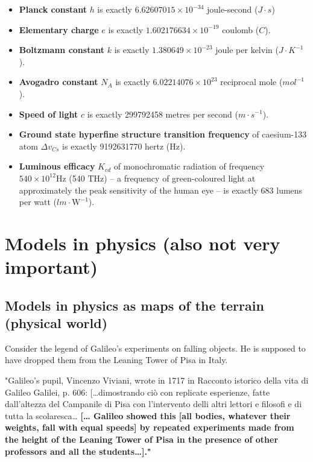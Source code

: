 \documentclass[11pt]{article}
\begin{document}
\begin{itemize}
\item \textbf{Planck constant} \(h\) is exactly \(6.62607015 \times 10^{-34}\) joule-second (\(\si{J} \cdot \si{s}\))
\item \textbf{Elementary charge} \(e\) is exactly \(1.602176634 \times 10^{-19}\) coulomb (\(\si{C}\)).
\item \textbf{Boltzmann constant} \(k\) is exactly \(1.380649 \times 10^{-23}\) joule per kelvin (\(\si{J} \cdot \si{K}^{-1}\)).
\item \textbf{Avogadro constant} \(N_A\) is exactly \(6.02214076 \times 10^{23}\) reciprocal mole (\(\si{mol}^{-1}\)).
\item \textbf{Speed of light} \(c\) is exactly 299792458 metres per second (\(\si{m} \cdot \si{s}^{-1}\)).
\item \textbf{Ground state hyperfine structure transition frequency} of caesium-133 atom \(\Delta v_{Cs}\) is exactly 9192631770 hertz (\(\si{\hertz}\)).
\item \textbf{Luminous efficacy} \(K_{cd}\) of monochromatic radiation of frequency \(540 \times 10^{12} \si{\hertz}\) (540 \(\si{\tera\hertz}\)) – a frequency of green-coloured light at approximately the peak sensitivity of the human eye – is exactly 683 lumens per watt (\(\si{lm} \cdot \si{\watt}^{-1}\)).

\newpage
\end{itemize}
\section{Models in physics (also not very important)}
\label{sec:org2473200}

\subsection{Models in physics as maps of the terrain (physical world)}
\label{sec:org9fc86cf}
Consider the legend of Galileo’s experiments on falling objects. He is supposed to have dropped them from the Leaning Tower of Pisa in Italy.


"Galileo’s pupil, Vincenzo Viviani, wrote in 1717 in Racconto istorico della vita di Galileo Galilei, p. 606: [\ldots{}dimostrando ciò con replicate esperienze, fatte dall'altezza del Campanile di Pisa con l'intervento delli altri lettori e filosofi e di tutta la scolaresca\ldots{} \textbf{{[}\ldots{} Galileo showed this [all bodies, whatever their weights, fall with equal speeds] by repeated experiments made from the height of the Leaning Tower of Pisa in the presence of other professors and all the students\ldots{}]."}
\end{document}
